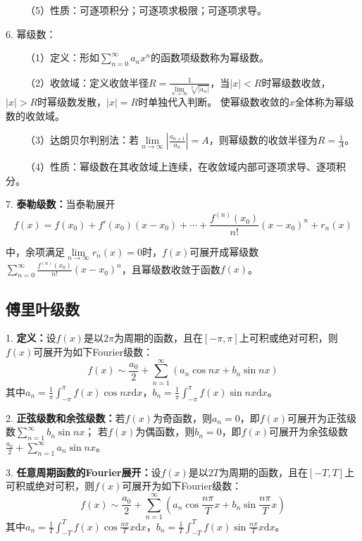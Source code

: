 ~~~~（5）性质：可逐项积分；可逐项求极限；可逐项求导。

6. 幂级数：

~~~~（1）定义：形如$\sum\limits_{n=0}^\infty a_nx^n$的函数项级数称为幂级数。

~~~~（2）收敛域：定义收敛半径$R=\frac{1}{\lim\limits_{n\rightarrow\infty}\sqrt[n]{|a_n|}}$，当$|x|<R$时幂级数收敛，$|x|>R$时幂级数发散，$|x|=R$时单独代入判断。
使幂级数收敛的$x$全体称为幂级数的收敛域。

~~~~（3）达朗贝尔判别法：若$\lim\limits_{n\rightarrow\infty}\left|\frac{a_{n+1}}{a_n}\right|=A$，则幂级数的收敛半径为$R=\frac{1}{A}$。

~~~~（4）性质：幂级数在其收敛域上连续，在收敛域内部可逐项求导、逐项积分。

7. \textbf{泰勒级数：}当泰勒展开
\begin{equation*}
    f(x)=f(x_0)+f'(x_0)(x-x_0)+\cdots+\frac{f^{(n)}(x_0)}{n!}(x-x_0)^n+r_n(x)
\end{equation*}

中，余项满足$\lim\limits_{n\rightarrow\infty}r_n(x)=0$时，$f(x)$可展开成幂级数$\sum\limits_{n=0}^\infty\frac{f^{(n)}(x_0)}{n!}(x-x_0)^n$，且幂级数收敛于函数$f(x)$。

\subsection{傅里叶级数}

1. \textbf{定义：}设$f(x)$是以$2\pi$为周期的函数，且在$[-\pi,\pi]$上可积或绝对可积，则$f(x)$可展开为如下Fourier级数：
\begin{equation*}
    f(x)\sim \frac{a_0}{2}+\sum\limits_{n=1}^\infty \left(a_n\cos nx+b_n\sin nx\right)
\end{equation*}
其中$a_n=\frac{1}{\pi}\int_{-\pi}^\pi f(x)\cos nx\mathrm{d}x$，$b_n=\frac{1}{\pi}\int_{-\pi}^\pi f(x)\sin nx\mathrm{d}x$。

2. \textbf{正弦级数和余弦级数：}若$f(x)$为奇函数，则$a_n=0$，即$f(x)$可展开为正弦级数$\sum\limits_{n=1}^\infty b_n\sin nx$；
若$f(x)$为偶函数，则$b_n=0$，即$f(x)$可展开为余弦级数$\frac{a_0}{2}+\sum\limits_{n=1}^\infty a_n\sin nx$。

3. \textbf{任意周期函数的Fourier展开：}设$f(x)$是以$2T$为周期的函数，且在$[-T,T]$上可积或绝对可积，则$f(x)$可展开为如下Fourier级数：
\begin{equation*}
    f(x)\sim \frac{a_0}{2}+\sum\limits_{n=1}^\infty \left(a_n\cos \frac{n\pi}{T}x+b_n\sin \frac{n\pi}{T}x\right)
\end{equation*}
其中$a_n=\frac{1}{T}\int_{-T}^T f(x)\cos \frac{n\pi}{T}x\mathrm{d}x$，$b_n=\frac{1}{T}\int_{-T}^T f(x)\sin \frac{n\pi}{T}x\mathrm{d}x$。

